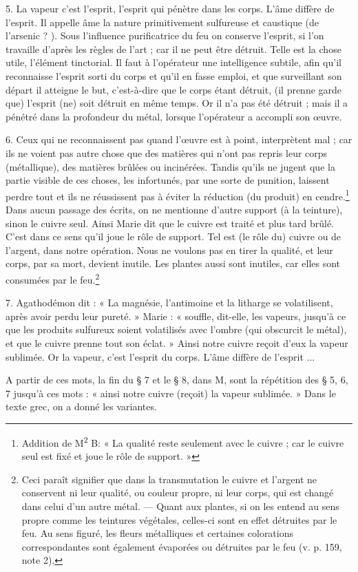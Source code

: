 \documentclass[a4paper, 11pt, oneside, polutonikogreek, french]{article}
\begin{document}
5. La vapeur c'est l'esprit, l'esprit qui pénètre dans les corps. L'âme diffère de l'esprit. Il appelle âme la nature primitivement sulfureuse et caustique (de l'arsenic ? ). Sous l'influence purificatrice du feu on conserve l'esprit, si l'on travaille d'après les règles de l'art ; car il ne peut être détruit. Telle est la chose utile, l'élément tinctorial. Il faut à l'opérateur une intelligence subtile, afin qu'il reconnaisse l'esprit sorti du corps et qu'il en fasse emploi, et que surveillant son départ il atteigne le but, c'est-à-dire que le corps étant détruit, (il prenne garde que) l'esprit (ne) soit détruit en même temps. Or il n'a pas été détruit ; mais il a pénétré dans la profondeur du métal, lorsque l'opérateur a accompli son œuvre.

6. Ceux qui ne reconnaissent pas quand l'œuvre est à point, interprètent mal ; car ils ne voient pas autre chose que des matières qui n'ont pas repris leur corps (métallique), des matières brûlées ou incinérées. Tandis qu'ils ne jugent que la partie visible de ces choses, les infortunés, par une sorte de punition, laissent perdre tout et ils ne réussissent pas à éviter la réduction (du produit) en cendre.\footnote{Addition de M\textsuperscript{2} B: « La qualité reste seulement avec le cuivre ; car le cuivre seul est fixé et joue le rôle de support. »} Dans aucun passage des écrits, on ne mentionne d'autre support (à la teinture), sinon le cuivre seul. Ainsi Marie dit que le cuivre est traité et plus tard brûlé. C'est dans ce sens qu'il joue le rôle de support. Tel est (le rôle du) cuivre ou de l'argent, dans notre opération. Nous ne voulons pas en tirer la qualité, et leur corps, par sa mort, devient inutile. Les plantes aussi sont inutiles, car elles sont consumées par le feu.\footnote{Ceci paraît signifier que dans la transmutation le cuivre et l'argent ne conservent ni leur qualité, ou couleur propre, ni leur corps, qui est changé dans celui d'un autre métal. --- Quant aux plantes, si on les entend au sens propre comme les teintures végétales, celles-ci sont en effet détruites par le feu. Au sens figuré, les fleurs métalliques et certaines colorations correspondantes sont également évaporées ou détruites par le feu (v. p. 159, note 2).}

7. Agathodémon dit : « La magnésie, l'antimoine et la litharge se volatilisent, après avoir perdu leur pureté. » Marie : « souffle, dit-elle, les vapeurs, jusqu'à ce que les produits sulfureux soient volatilisés avec l'ombre (qui obscurcit le métal), et que le cuivre prenne tout son éclat. » Ainsi notre cuivre reçoit d'eux la vapeur sublimée. Or la vapeur, c'est l'esprit du corps. L'âme diffère de l'esprit ...
\begin{center}
A partir de ces mots, la fin du § 7 et le § 8, dans M, sont la répétition des § 5, 6, 7 jusqu'à ces mots : « ainsi notre cuivre (reçoit) la vapeur sublimée. » Dans le texte grec, on a donné les variantes.
\end{center}
\end{document}
